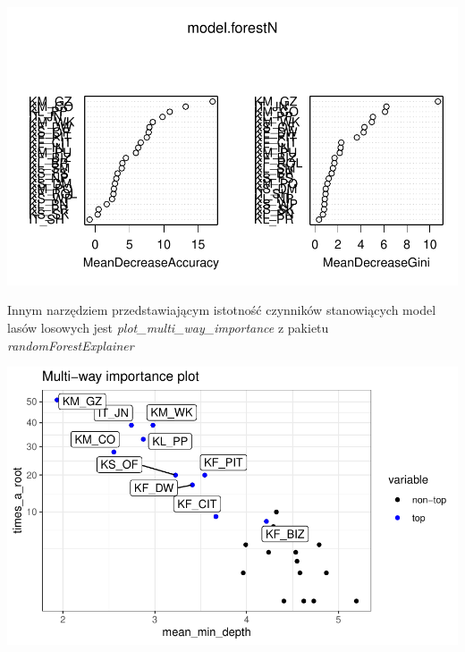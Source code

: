 \documentclass{amuthesis}
\begin{document}
\begin{center}\includegraphics[width=1.05\linewidth]{figures/unnamed-chunk-19-1} \end{center}

Innym narzędziem przedstawiającym istotność czynników stanowiących model lasów losowych jest \emph{plot\_multi\_way\_importance} z pakietu \emph{randomForestExplainer} \autocite{R-randomForestExplainer}

\begin{Shaded}
\begin{Highlighting}[]
\SpecialCharTok{::}
     \NormalTok{)}
\end{Highlighting}
\end{Shaded}

\begin{center}\includegraphics[width=1\linewidth]{figures/unnamed-chunk-20-1} \end{center}
\end{document}
